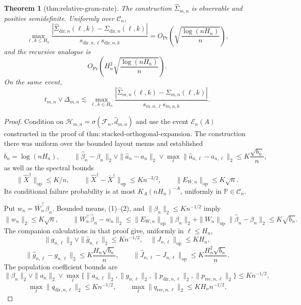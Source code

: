 \documentclass{article}
\newtheorem{theorem}{Theorem}
\begin{document}
\begin{theorem}[thm:relative-gram-rate]\label{thm:relative-gram-rate}
The construction \(\widehat\Sigma_{m,n}\) is observable and positive semidefinite. Uniformly over \(\mathcal C_n\),
\[
 \max_{\ell,k\le H_n}
 \frac{|\widehat\Sigma_{\mathrm{dir},n}(\ell,k)-\Sigma_{\mathrm{dir},n}(\ell,k)|}
 {s_{\mathrm{dir},n,\ell}s_{\mathrm{dir},n,k}}
 =O_{\Pr}\!\left(\sqrt{\frac{\log(nH_n)}n}\right),
\]
and the recursive analogue is
\[
 O_{\Pr}\!\left(H_n^2\sqrt{\frac{\log(nH_n)}n}\right).
\]
On the same event,
\[
 t_{m,n}\vee\Delta_{m,n}\lesssim
 \max_{\ell,k\le H_n}
 \frac{|\widehat\Sigma_{m,n}(\ell,k)-\Sigma_{m,n}(\ell,k)|}
 {s_{m,n,\ell}s_{m,n,k}}.
\]
\end{theorem}
\begin{proof}
Condition on \(\mathcal H_{m,n}=\sigma(\mathcal F_n,\widehat d_{m,n})\) and use the event \(\mathcal E_n(A)\) constructed in the proof of \(\mathrm{thm{:}stacked\mbox{-}orthogonal\mbox{-}expansion}\).  The construction there was uniform over the bounded layout menus and established
\[
 b_n=\log(nH_n),\qquad
 \|\widehat\beta_n-\beta_n\|_2\vee\|\widehat a_n-a_n\|_2
 \vee\max_\ell\|\widehat a_{n,\ell}-a_{n,\ell}\|_2
 \le K\frac{\sqrt{b_n}}n,
 \tag{1}
\]
as well as the spectral bounds
\[
 \|\widehat X^\dagger\|_{\mathrm{op}}\le K/n,\qquad
 \|\widehat X^\dagger-\bar X^\dagger\|_{\mathrm{op}}\le Kn^{-3/2},\qquad
 \|E_{W,n}\|_{\mathrm{op}}\le K\sqrt n.
 \tag{2}
\]
Its conditional failure probability is at most \(K_A(nH_n)^{-A}\), uniformly in \(\mathbb P\in\mathcal C_n\).

Put \(w_n=\bar W_n^\top\beta_n\).  Bounded means, (1)--(2), and \(\|\beta_n\|_2\le K n^{-1/2}\) imply
\[
 \|w_n\|_2\le K\sqrt n,\qquad
 \|W_n^\top\widehat\beta_n-w_n\|_2
 \le\|E_{W,n}\|_{\mathrm{op}}\|\beta_n\|_2
 +\|W_n\|_{\mathrm{op}}\|\widehat\beta_n-\beta_n\|_2
 \le K\sqrt{b_n}.
 \tag{3}
\]
The companion calculations in that proof give, uniformly in \(\ell\le H_n\),
\[
 \|g_{n,\ell}\|_2\vee\|\widehat g_{n,\ell}\|_2\le K n^{-1/2},\quad
 \|J_{n,\ell}\|_{\mathrm{op}}\le KH_n,
 \tag{4}
\]
\[
 \|\widehat g_{n,\ell}-g_{n,\ell}\|_2
 \le K\frac{H_n\sqrt{b_n}}n,\qquad
 \|\widehat J_{n,\ell}-J_{n,\ell}\|_{\mathrm{op}}
 \le K\frac{H_n^2\sqrt{b_n}}n.
 \tag{5}
\]
The population coefficient bounds are
\[
 \|\beta_n\|_2\vee\|a_n\|_2\vee
 \max_\ell\{\|a_{n,\ell}\|_2,\|g_{n,\ell}\|_2,
 \|p_{\mathrm{dir},n,\ell}\|_2,\|p_{\mathrm{rec},n,\ell}\|_2\}
 \le K n^{-1/2},
 \tag{6}
\]
\[
 \max_\ell\|q_{\mathrm{dir},n,\ell}\|_2\le K n^{-1/2},\qquad
 \max_\ell\|q_{\mathrm{rec},n,\ell}\|_2\le KH_n n^{-1/2}.
 \tag{7}
\]


\end{proof}
\end{document}
